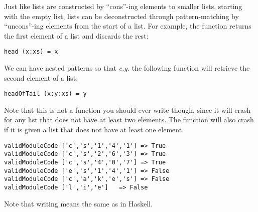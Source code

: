 \taskLine 

Just like lists are constructed by ``cons''-ing elements to smaller lists, starting with the empty list, lists can be deconstructed through pattern-matching by ``uncons''-ing elements from the start of a list. For example, the  function returns the first element of a list and discards the rest:
\begin{verbatim}
head (x:xs) = x
\end{verbatim}
We can have nested patterns so that \emph{e.g.} the following function will retrieve the second element of a list:
\begin{verbatim}
headOfTail (x:y:xs) = y
\end{verbatim}
Note that this is not a function you should ever write though, since it will crash for any list that does not have at least two elements. The  function will also crash if it is given a list that does not have at least one element.

\begin{verbatim}
validModuleCode ['c','s','1','4','1'] => True 
validModuleCode ['c','s','2','6','3'] => True
validModuleCode ['c','s','4','0','7'] => True
validModuleCode ['e','s','1','4','1'] => False
validModuleCode ['c','a','k','e','s'] => False
validModuleCode ['l','i','e']   => False
\end{verbatim}
Note that writing  means the same as \haskellIn{['c','s','1','4','1']} in Haskell.

\taskLine


